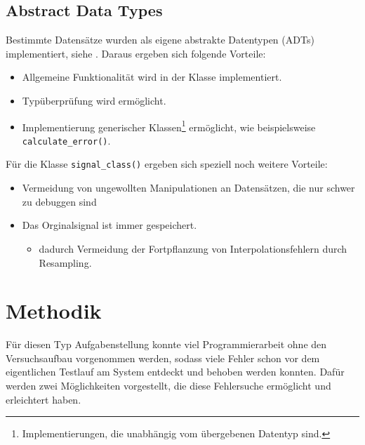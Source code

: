\documentclass[../Report.tex]{subfiles}
\begin{document}
\subsection*{Abstract Data Types}
\label{subsec:code.adt}
Bestimmte Datensätze wurden als eigene abstrakte Datentypen (ADTs) implementiert, siehe \cite[Kap. 6.1]{mcConnell}. Daraus ergeben sich folgende Vorteile:
\begin{itemize}
	\item Allgemeine Funktionalität wird in der Klasse implementiert.
	\item Typüberprüfung wird ermöglicht.
	\item Implementierung generischer Klassen\footnote{Implementierungen, die unabhängig vom übergebenen Datentyp sind.} ermöglicht, wie beispielsweise \lstinline{calculate_error()}.
\end{itemize}
Für die Klasse \lstinline{signal_class()} ergeben sich speziell noch weitere Vorteile:
\begin{itemize}
\item Vermeidung von ungewollten Manipulationen an Datensätzen, die nur schwer zu debuggen sind
	\item Das Orginalsignal ist immer gespeichert.
	\begin{itemize}
		\item dadurch Vermeidung der Fortpflanzung von Interpolationsfehlern durch Resampling.
	\end{itemize}
\end{itemize}

\section{Methodik}
\label{subsec:code.methodik}
Für diesen Typ Aufgabenstellung konnte viel Programmierarbeit ohne den Versuchsaufbau vorgenommen werden, sodass viele Fehler schon vor dem eigentlichen Testlauf am System entdeckt und behoben werden konnten. Dafür werden zwei Möglichkeiten vorgestellt, die diese Fehlersuche ermöglicht und erleichtert haben.
\end{document}
